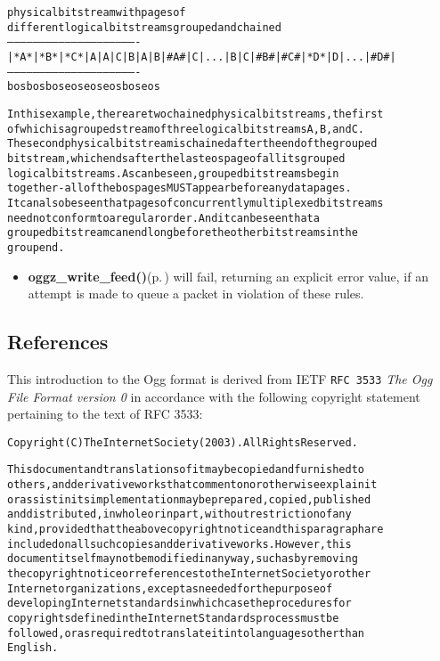 \small\begin{alltt}               physical bitstream with pages of 
          different logical bitstreams grouped and chained
      -------------------------------------------------------------
      |*A*|*B*|*C*|A|A|C|B|A|B|#A\#|C|...|B|C|#B\#|#C\#|*D*|D|...|#D\#|
      -------------------------------------------------------------
       bos bos bos             eos           eos eos bos       eos\end{alltt}\normalsize 


\small\begin{alltt}   In this example, there are two chained physical bitstreams, the first
   of which is a grouped stream of three logical bitstreams A, B, and C.
   The second physical bitstream is chained after the end of the grouped
   bitstream, which ends after the last eos page of all its grouped
   logical bitstreams.  As can be seen, grouped bitstreams begin
   together - all of the bos pages MUST appear before any data pages.
   It can also be seen that pages of concurrently multiplexed bitstreams
   need not conform to a regular order.  And it can be seen that a
   grouped bitstream can end long before the other bitstreams in the
   group end.
\end{alltt}\normalsize 


\begin{itemize}
\item {\bf oggz\_\-write\_\-feed()}{\rm (p.\,\pageref{group__write__api_ga2})} will fail, returning an explicit error value, if an attempt is made to queue a packet in violation of these rules.\end{itemize}
\subsection{References}\label{References}
This introduction to the Ogg format is derived from IETF {\tt RFC 3533} {\em The Ogg File Format version 0\/} in accordance with the following copyright statement pertaining to the text of RFC 3533:

\small\begin{alltt}
   Copyright (C) The Internet Society (2003).  All Rights Reserved.\end{alltt}\normalsize 


\small\begin{alltt}   This document and translations of it may be copied and furnished to
   others, and derivative works that comment on or otherwise explain it
   or assist in its implementation may be prepared, copied, published
   and distributed, in whole or in part, without restriction of any
   kind, provided that the above copyright notice and this paragraph are
   included on all such copies and derivative works.  However, this
   document itself may not be modified in any way, such as by removing
   the copyright notice or references to the Internet Society or other
   Internet organizations, except as needed for the purpose of
   developing Internet standards in which case the procedures for
   copyrights defined in the Internet Standards process must be
   followed, or as required to translate it into languages other than
   English.\end{alltt}\normalsize 


